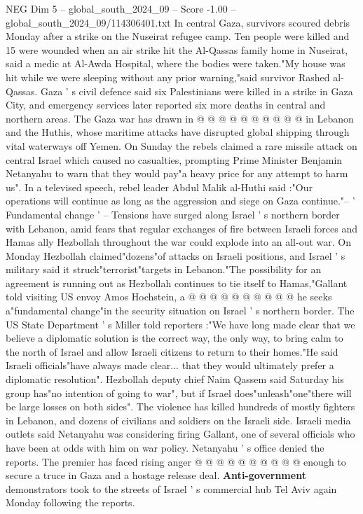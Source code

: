\begin{textsample}{NEG Dim 5 – global\_south\_2024\_09 – Score -1.00 – global\_south\_2024\_09/114306401.txt}
In central Gaza, survivors scoured debris Monday after a strike on the Nuseirat refugee camp.
Ten people were killed and 15 were wounded when an air strike hit the Al-Qassas family home in Nuseirat, said a medic at Al-Awda Hospital, where the bodies were taken."My house was hit while we were sleeping without any prior warning,"said survivor Rashed al-Qassas.
Gaza ' s civil defence said six Palestinians were killed in a strike in Gaza City, and emergency services later reported six more deaths in central and northern areas.
The Gaza war has drawn in @ @ @ @ @ @ @ @ @ @ in Lebanon and the Huthis, whose maritime attacks have disrupted global shipping through vital waterways off Yemen.
On Sunday the rebels claimed a rare missile attack on central Israel which caused no casualties, prompting Prime Minister Benjamin Netanyahu to warn that they would pay"a heavy price for any attempt to harm us".
In a televised speech, rebel leader Abdul Malik al-Huthi said :"Our operations will continue as long as the aggression and siege on Gaza continue."-- ' Fundamental change ' -- Tensions have surged along Israel ' s northern border with Lebanon, amid fears that regular exchanges of fire between Israeli forces and Hamas ally Hezbollah throughout the war could explode into an all-out war.
On Monday Hezbollah claimed"dozens"of attacks on Israeli positions, and Israel ' s military said it struck"terrorist"targets in Lebanon."The possibility for an agreement is running out as Hezbollah continues to tie itself to Hamas,"Gallant told visiting US envoy Amos Hochstein, a @ @ @ @ @ @ @ @ @ @ he seeks a"fundamental change"in the security situation on Israel ' s northern border.
The US State Department ' s Miller told reporters :"We have long made clear that we believe a diplomatic solution is the correct way, the only way, to bring calm to the north of Israel and allow Israeli citizens to return to their homes."He said Israeli officials"have always made clear... that they would ultimately prefer a diplomatic resolution".
Hezbollah deputy chief Naim Qassem said Saturday his group has"no intention of going to war", but if Israel does"unleash"one"there will be large losses on both sides".
The violence has killed hundreds of mostly fighters in Lebanon, and dozens of civilians and soldiers on the Israeli side.
Israeli media outlets said Netanyahu was considering firing Gallant, one of several officials who have been at odds with him on war policy.
Netanyahu ' s office denied the reports.
The premier has faced rising anger @ @ @ @ @ @ @ @ @ @ enough to secure a truce in Gaza and a hostage release deal. \textbf{Anti-government} demonstrators took to the streets of Israel ' s commercial hub Tel Aviv again Monday following the reports.

\end{textsample}

